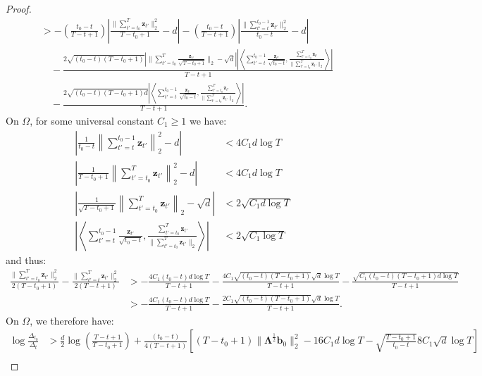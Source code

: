 \begin{proof}
\begin{align*}
    &> -\left(\frac{t_0-t}{T-t+1}\right)\left|\frac{\lVert\sum_{t'=t_0}^T\mathbf{z}_{t'}\rVert_2^2}{T-t_0 + 1} - d\right| - \left(\frac{t_0-t}{T-t+1}\right)\left|\frac{\lVert\sum_{t'=t}^{t_0-1}\mathbf{z}_{t'}\rVert_2^2}{t_0-t} -d \right| \\
    &\quad -\frac{2\sqrt{(t_0-t)(T-t_0+1)}\left|\lVert\sum_{t'=t_0}^{T}\frac{\mathbf{z}_{t'}}{\sqrt{T-t_0+1}}\rVert_2 -\sqrt{d}\right|\left|\left\langle \sum_{t'=t}^{t_0-1}\frac{\mathbf{z}_{t'}}{\sqrt{t_0-t}}, \frac{\sum_{t'=t_0}^{T}\mathbf{z}_{t'}}{\lVert\sum_{t'=t_0}^{T}\mathbf{z}_{t'}\rVert_2}\right\rangle\right|}{T-t+1} \\
    &\quad-\frac{2\sqrt{(t_0-t)(T-t_0+1)d}\left|\left\langle \sum_{t'=t}^{t_0-1}\frac{\mathbf{z}_{t'}}{\sqrt{t_0-t}}, \frac{\sum_{t'=t_0}^T\mathbf{z}_{t'}}{\lVert\sum_{t'=t_0}^T\mathbf{z}_{t'}\rVert_2}\right\rangle\right|}{T-t+1}.
\end{align*}
\normalsize
On $\Omega$, for some universal constant $C_1 \geq 1$ we have:
\begin{align*}
    \left|\frac{1}{t_0-t}\left\lVert\sum_{t'=t}^{t_0-1}\mathbf{z}_{t'}\right\rVert_2^2 - d\right| &< 4C_1d\log T \\
    \left|\frac{1}{T-t_0+1}\left\lVert\sum_{t'=t_0}^T\mathbf{z}_{t'}\right\rVert_2^2 - d\right| &< 4C_1d\log T \\
    \left|\frac{1}{\sqrt{T-t_0+1}}\left\lVert\sum_{t'=t_0}^{T}\mathbf{z}_{t'}\right\rVert_2 -\sqrt{d}\right| &< 2\sqrt{C_1 d\log T}\\
    \left|\left\langle \sum_{t'=t}^{t_0-1}\frac{\mathbf{z}_{t'}}{\sqrt{t_0-t}}, \frac{\sum_{t'=t_0}^{T}\mathbf{z}_{t'}}{\lVert\sum_{t'=t_0}^{T}\mathbf{z}_{t'}\rVert_2}\right\rangle\right| &< 2\sqrt{C_1\log T}
\end{align*}
and thus:
\small
\begin{align*}
    \frac{\lVert\sum_{t'=t_0}^T\mathbf{z}_{t'}\rVert_2^2}{2(T-t_0+1)} - \frac{\lVert\sum_{t'=t}^T\mathbf{z}_{t'}\rVert_2^2}{2(T-t+1)} &> -\frac{4C_1(t_0-t)d\log T}{T-t+1} - \frac{4C_1\sqrt{(t_0-t)(T-t_0+1)}\sqrt{d}\log T}{T-t+1} - \frac{\sqrt{C_1(t_0-t)(T-t_0+1)d\log T}}{T-t+1}\\
    &> -\frac{4C_1(t_0-t)d\log T}{T-t+1} - \frac{2C_1\sqrt{(t_0-t)(T-t_0+1)}\sqrt{d}\log T}{T-t+1}.
\end{align*}
\normalsize
On $\Omega$, we therefore have:
\begin{align*}
    \log \frac{\Delta_{t_0}}{\Delta_t} &> \frac{d}{2}\log\left(\frac{T-t+1}{T-t_0+1}\right) + \frac{(t_0 - t) }{4(T-t+1)}\left[(T-t_0+1)\lVert\boldsymbol{\Lambda}^{\frac{1}{2}} \mathbf{b}_0\rVert^2_2 -16C_1d\log T - \sqrt{\frac{T-t_0+1}{t_0-t}}8C_1\sqrt{d}\log T\right] \\

\end{align*}
\end{proof}
